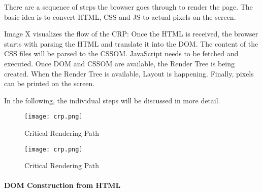 
There are a sequence of steps the browser goes through to render the page.
The basic idea is to convert HTML, CSS and JS to actual pixels on the screen.

Image X visualizes the flow of the CRP:
Once the HTML is received, the browser starts with parsing the HTML and translate it into the DOM.
The content of the CSS files will be parsed to the CSSOM.
JavaScript needs to be fetched and executed.
Once DOM and CSSOM are available, the Render Tree is being created.
When the Render Tree is available, Layout is happening.
Finally, pixels can be printed on the screen.

In the following, the individual steps will be discussed in more detail.


\begin{figure}[h!]
\begin{center}
\texttt{[image: crp.png]}
\caption{Critical Rendering Path}
\label{img:crp}
\end{center}
\end{figure}







\begin{figure}[h!]
\begin{center}
\texttt{[image: crp.png]}
\caption{Critical Rendering Path}
\label{img:crp}
\end{center}
\end{figure}


\paragraph{DOM Construction from HTML}

